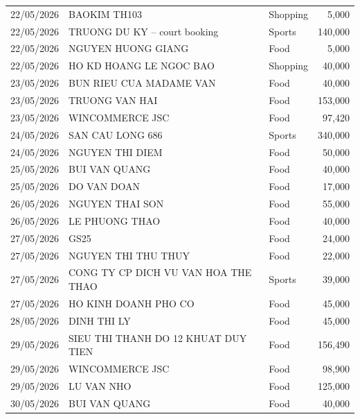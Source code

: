 {\begin{longtable}{lp{6.2cm}lr}
22/05/2026 & BAOKIM TH103                          & Shopping        &   5,000 \\
22/05/2026 & TRUONG DU KY -- court booking         & Sports          & 140,000 \\
22/05/2026 & NGUYEN HUONG GIANG                    & Food            &   5,000 \\
22/05/2026 & HO KD HOANG LE NGOC BAO               & Shopping        &  40,000 \\
23/05/2026 & BUN RIEU CUA MADAME VAN               & Food            &  40,000 \\
23/05/2026 & TRUONG VAN HAI                        & Food            & 153,000 \\
23/05/2026 & WINCOMMERCE JSC                       & Food            &  97,420 \\
24/05/2026 & SAN CAU LONG 686                      & Sports          & 340,000 \\
24/05/2026 & NGUYEN THI DIEM                       & Food            &  50,000 \\
25/05/2026 & BUI VAN QUANG                         & Food            &  40,000 \\
25/05/2026 & DO VAN DOAN                           & Food            &  17,000 \\
26/05/2026 & NGUYEN THAI SON                       & Food            &  55,000 \\
26/05/2026 & LE PHUONG THAO                        & Food            &  40,000 \\
27/05/2026 & GS25                                  & Food            &  24,000 \\
27/05/2026 & NGUYEN THI THU THUY                   & Food            &  22,000 \\
27/05/2026 & CONG TY CP DICH VU VAN HOA THE THAO   & Sports          &  39,000 \\
27/05/2026 & HO KINH DOANH PHO CO                  & Food            &  45,000 \\
28/05/2026 & DINH THI LY                           & Food            &  45,000 \\
29/05/2026 & SIEU THI THANH DO 12 KHUAT DUY TIEN   & Food            & 156,490 \\
29/05/2026 & WINCOMMERCE JSC                       & Food            &  98,900 \\
29/05/2026 & LU VAN NHO                            & Food            & 125,000 \\
30/05/2026 & BUI VAN QUANG                         & Food            &  40,000 \\

\end{longtable}}
